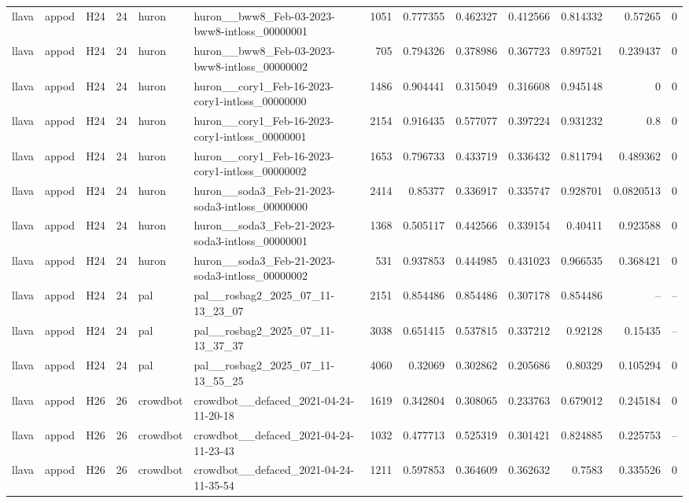 \begin{longtable}{lllrllrrrrrrr}
llava & appod & H24 & 24 & huron & huron\_\_bww8\_Feb-03-2023-bww8-intloss\_00000001 & 1051 & 0.777355 & 0.462327 & 0.412566 & 0.814332 & 0.57265 & 0 \\
llava & appod & H24 & 24 & huron & huron\_\_bww8\_Feb-03-2023-bww8-intloss\_00000002 & 705 & 0.794326 & 0.378986 & 0.367723 & 0.897521 & 0.239437 & 0 \\
llava & appod & H24 & 24 & huron & huron\_\_cory1\_Feb-16-2023-cory1-intloss\_00000000 & 1486 & 0.904441 & 0.315049 & 0.316608 & 0.945148 & 0 & 0 \\
llava & appod & H24 & 24 & huron & huron\_\_cory1\_Feb-16-2023-cory1-intloss\_00000001 & 2154 & 0.916435 & 0.577077 & 0.397224 & 0.931232 & 0.8 & 0 \\
llava & appod & H24 & 24 & huron & huron\_\_cory1\_Feb-16-2023-cory1-intloss\_00000002 & 1653 & 0.796733 & 0.433719 & 0.336432 & 0.811794 & 0.489362 & 0 \\
llava & appod & H24 & 24 & huron & huron\_\_soda3\_Feb-21-2023-soda3-intloss\_00000000 & 2414 & 0.85377 & 0.336917 & 0.335747 & 0.928701 & 0.0820513 & 0 \\
llava & appod & H24 & 24 & huron & huron\_\_soda3\_Feb-21-2023-soda3-intloss\_00000001 & 1368 & 0.505117 & 0.442566 & 0.339154 & 0.40411 & 0.923588 & 0 \\
llava & appod & H24 & 24 & huron & huron\_\_soda3\_Feb-21-2023-soda3-intloss\_00000002 & 531 & 0.937853 & 0.444985 & 0.431023 & 0.966535 & 0.368421 & 0 \\
llava & appod & H24 & 24 & pal & pal\_\_rosbag2\_2025\_07\_11-13\_23\_07 & 2151 & 0.854486 & 0.854486 & 0.307178 & 0.854486 & -- & -- \\
llava & appod & H24 & 24 & pal & pal\_\_rosbag2\_2025\_07\_11-13\_37\_37 & 3038 & 0.651415 & 0.537815 & 0.337212 & 0.92128 & 0.15435 & -- \\
llava & appod & H24 & 24 & pal & pal\_\_rosbag2\_2025\_07\_11-13\_55\_25 & 4060 & 0.32069 & 0.302862 & 0.205686 & 0.80329 & 0.105294 & 0 \\
llava & appod & H26 & 26 & crowdbot & crowdbot\_\_defaced\_2021-04-24-11-20-18 & 1619 & 0.342804 & 0.308065 & 0.233763 & 0.679012 & 0.245184 & 0 \\
llava & appod & H26 & 26 & crowdbot & crowdbot\_\_defaced\_2021-04-24-11-23-43 & 1032 & 0.477713 & 0.525319 & 0.301421 & 0.824885 & 0.225753 & -- \\
llava & appod & H26 & 26 & crowdbot & crowdbot\_\_defaced\_2021-04-24-11-35-54 & 1211 & 0.597853 & 0.364609 & 0.362632 & 0.7583 & 0.335526 & 0 \\

\end{longtable}
